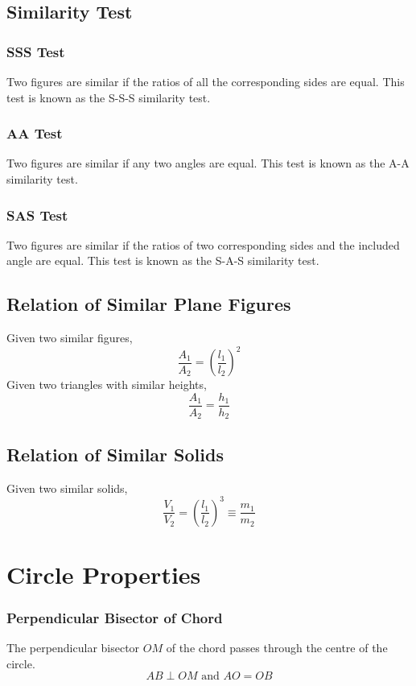 \documentclass{report}
\begin{document}
\begin{flushleft}
\subsection{Similarity Test}
\subsubsection{SSS Test}
Two figures are similar if the ratios of all the corresponding sides are equal. This test is known as the S-S-S similarity test.

\subsubsection{AA Test}
Two figures are similar if any two angles are equal. This test is known as the A-A similarity test.

\subsubsection{SAS Test}
Two figures are similar if the ratios of two corresponding sides and the included angle are equal. This test is known as the S-A-S similarity test.

\subsection{Relation of Similar Plane Figures}
Given two similar figures,
\begin{equation}
\frac{A_1}{A_2}=\left(\frac{l_1}{l_2}\right)^2
\end{equation}
Given two triangles with similar heights,
\begin{equation}
\frac{A_1}{A_2}=\frac{h_1}{h_2}
\end{equation}

\subsection{Relation of Similar Solids}
Given two similar solids,
\begin{equation}
\frac{V_1}{V_2}=\left(\frac{l_1}{l_2}\right)^3\equiv \frac{m_1}{m_2}
\end{equation}

\section{Circle Properties}

\subsubsection{Perpendicular Bisector of Chord}
The perpendicular bisector $OM$ of the chord passes through the centre of the circle.
\begin{equation}
AB \perp OM \text{ and } AO = OB
\end{equation}


\end{flushleft}
\end{document}
